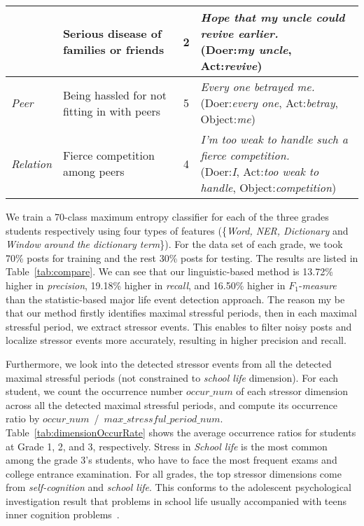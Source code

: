 \begin{table*}
\begin{center}
\begin{footnotesize}
\begin{tabular}{llcl}
&	Serious disease of families or friends	&	2	&
\tabincell{l}{\emph{Hope that my uncle could revive earlier.}
\\(Doer:\emph{my uncle}, Act:\emph{revive})}\\ \hline
\emph{Peer}	&	Being hassled for not fitting in with peers	&	5	&
\tabincell{l}{\emph{Every one betrayed me.}
\\(Doer:\emph{every one}, Act:\emph{betray}, Object:\emph{me})}\\ \cline{2-4}
\emph{Relation}	&	Fierce competition among peers	&	4	&
\tabincell{l}{\emph{I'm too weak to handle such a fierce competition.}
\\(Doer:\emph{I}, Act:\emph{too weak to handle}, Object:\emph{competition})}\\ \hline
\end{tabular}
\end{footnotesize}
\label{tab:typeOccurNum3}
\end{center}
\end{table*}

We train a 70-class maximum entropy classifier for each of the three grades students respectively
using four types of features (\{\emph{Word, NER, Dictionary} and \emph{Window around the dictionary term}\}).
For the data set of each grade, we took 70\% posts for training and the rest 30\% posts for testing.
The results are listed in Table~\ref{tab:compare}.
We can see that our linguistic-based method is 13.72\% higher in \emph{precision},
19.18\% higher in \emph{recall}, and 16.50\% higher in $F_1$-\emph{measure}
than the statistic-based major life event detection approach.
The reason my be that our method firstly identifies maximal stressful periods,
then in each maximal stressful period, we extract stressor events. This enables
to filter noisy posts and localize stressor events more accurately,
resulting in higher precision and recall.

Furthermore, we look into the detected stressor events from all the detected maximal stressful periods (not constrained to \emph{school life} dimension).
For each student, we count the occurrence number $occur\_num$ of each stressor dimension
across all the detected maximal stressful periods, and compute its
occurrence ratio by $occur\_num$~/~$max\_stressful\_period\_num$.
Table~\ref{tab:dimensionOccurRate} shows the average occurrence ratios for students at Grade 1, 2, and 3, respectively.
Stress in \emph{School life} is the most common among the grade 3's students,
who have to face the most frequent exams and college entrance examination.
For all grades, the top stressor dimensions come from \emph{self-cognition} and \emph{school life}.
This conforms to the adolescent psychological investigation result
that problems in school life usually accompanied with teens inner cognition problems~\cite{Byrne2007Profiles}.

